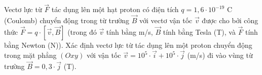 \begin{ex}
Vectơ lực từ $\vec F$ tác dụng lên một hạt proton có điện tích $q=1{,}6\cdot10^{-19}$ C (Coulomb) chuyển động trong từ trường $\vec B$ với vectơ vận tốc $\vec v$ được cho bởi công thức $\vec F=q\cdot\left[\vec v,\vec B\right]$ (trong đó $\vec v$ tính bằng m/s, $\vec B$ tính bằng Tesla (T), và $\vec F$ tính bằng Newton (N)). Xác định vectơ lực từ tác dụng lên một proton chuyển động trong mặt phẳng $(Oxy)$ với vận tốc $\vec v=10^5\cdot\vec i+10^5\cdot\vec j$ (m/s) đi vào vùng từ trường $\vec B=0{,}3\cdot\vec j$ (T).
\end{ex}
